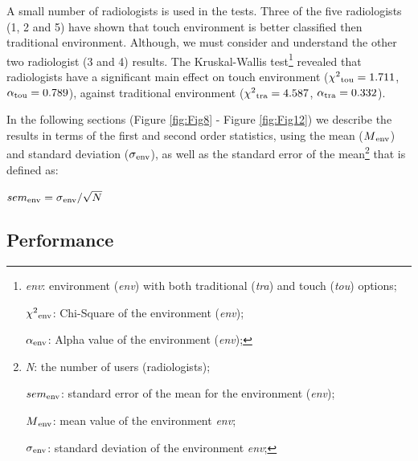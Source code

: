 \documentclass{chi-ext}
\begin{document}
A small number of radiologists is used in the tests. Three of the five radiologists (1, 2 and 5) have shown that touch environment is better classified then traditional environment. Although, we must consider and understand the other two radiologist (3 and 4) results. The Kruskal-Wallis test\footnote{
\textit{env}: environment (\textit{env}) with both traditional (\textit{tra}) and touch (\textit{tou}) options;

$\chi^2\textsubscript{env}$: Chi-Square of the environment (\textit{env});

$\alpha\textsubscript{env}$: Alpha value of the environment (\textit{env});
} revealed that radiologists have a significant main effect on touch environment ($\chi^2\textsubscript{tou} = 1.711$, $\alpha\textsubscript{tou} = 0.789$), against traditional environment ($\chi^2\textsubscript{tra} = 4.587$, $\alpha\textsubscript{tra} = 0.332$).

In the following sections (Figure \ref{fig:Fig8} - Figure \ref{fig:Fig12}) we describe the results in terms of the first and second order statistics, using the mean ($M\textsubscript{env}$) and standard deviation ($\sigma\textsubscript{env}$), as well as the standard error of the mean\footnote{
\textit{N}: the number of users (radiologists);

$sem\textsubscript{env}$: standard error of the mean for the environment (\textit{env});

$M\textsubscript{env}$: mean value of the environment \textit{env};

$\sigma\textsubscript{env}$: standard deviation of the environment \textit{env};
} that is defined as:

\begin{center}
$sem\textsubscript{env} = \sigma\textsubscript{env}/\sqrt{N}$
\end{center}

\subsection{Performance}
\end{document}
